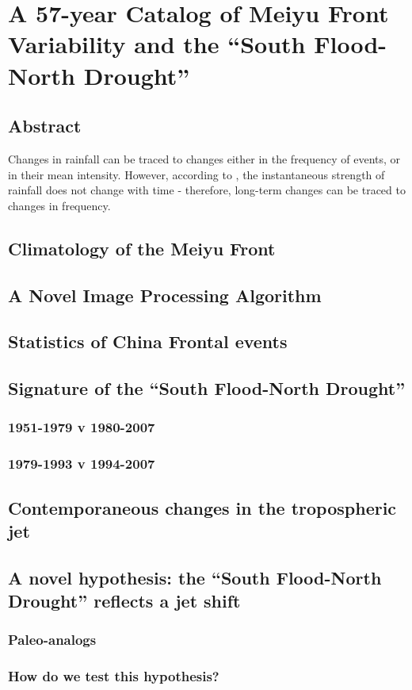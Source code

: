 \chapter{A 57-year Catalog of Meiyu Front Variability and the ``South Flood-North Drought''}

\section{Abstract}
Changes in rainfall can be traced to changes either in the frequency of events, or in their mean intensity. However, according to \cite{Biasutti2011}, the instantaneous strength of rainfall does not change with time - therefore, long-term changes can be traced to changes in frequency.

\section{Climatology of the Meiyu Front}

\section{A Novel Image Processing Algorithm}

\section{Statistics of China Frontal events}

\section{Signature of the ``South Flood-North Drought''}
\subsection{1951-1979 v 1980-2007}
\subsection{1979-1993 v 1994-2007}

\section{Contemporaneous changes in the tropospheric jet}

\section{A novel hypothesis: the ``South Flood-North Drought'' reflects a jet shift}
\subsection{Paleo-analogs}
\subsection{How do we test this hypothesis?}
